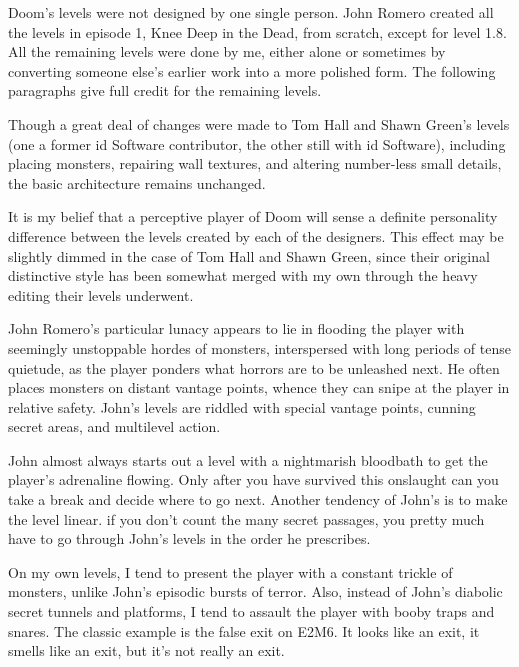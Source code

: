 Doom's levels were not designed by one single person. John Romero created all the levels in episode 1, Knee Deep in the Dead, from scratch, except for level 1.8. All the remaining levels were done by me, either alone or sometimes by converting someone else's earlier work into a more polished form. The following paragraphs give full credit for the remaining levels.\\
\par
 Though a great deal of changes were made to Tom Hall and Shawn Green's levels (one a former id Software contributor, the other still with id Software), including placing monsters, repairing wall textures, and altering number-less small details, the basic architecture remains unchanged.\\
\par
It is my belief that a perceptive player of Doom will sense a definite personality difference between the levels created by each of the designers. This effect may be slightly dimmed in the case of Tom Hall and Shawn Green, since their original distinctive style has been somewhat merged with my own through the heavy editing their levels underwent.\\
\par
 John Romero's particular lunacy appears to lie in flooding the player with seemingly unstoppable hordes of monsters, interspersed with long periods of tense quietude, as the player ponders what horrors are to be unleashed next. He often places monsters on distant vantage points, whence they can snipe at the player in relative safety. John's levels are riddled with special vantage points, cunning secret areas, and multilevel action.\\
 \par
  John almost always starts out a level with a nightmarish bloodbath to get the player's adrenaline flowing. Only after you have survived this onslaught can you take a break and decide where to go next. Another tendency of John's is to make the level linear. if you don't count the many secret passages, you pretty much have to go through John's levels in the order he prescribes.\\
  \par
   On my own levels, I tend to present the player with a constant trickle of monsters, unlike John's episodic bursts of terror. Also, instead of John's diabolic secret tunnels and platforms, I tend to assault the player with booby traps and snares. The classic example is the false exit on E2M6. It looks like an exit, it smells like an exit, but it's not really an exit.\\
